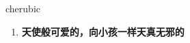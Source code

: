 
\begin{frame}
{\huge cherubic}
\begin{center}
\begin{enumerate}\Large
  \item \textbf{天使般可爱的，向小孩一样天真无邪的}
\end{enumerate}
\end{center}
\end{frame}
